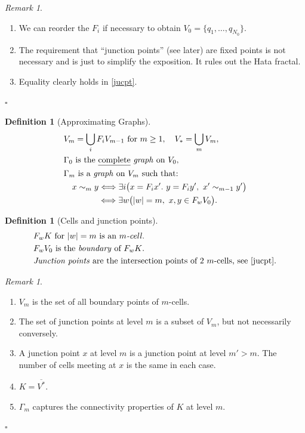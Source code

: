 \documentclass[a4paper]{amsart}
\theoremstyle{plain}
\theoremstyle{definition}
\newtheorem{definition}[theorem]{Definition}%
\theoremstyle{remark}
\newtheorem{remark}[theorem]{Remark}
\begin{document}
\begin{remark} \mbox{}
\begin{enumerate}
\item We can reorder the $ F_i $  if necessary to obtain $ V_0 =  \{ q_1,\dots , q_{N_0} \} $. 
\item The requirement that   ``junction points'' (see later) are fixed points is not necessary and is just to simplify the exposition.  It rules out the Hata fractal.
\item Equality clearly holds in \eqref{jucpt}.
\end{enumerate} 
\hfill $\square$  \end{remark} 

\begin{definition}[Approximating Graphs]  
\begin{align*} 
&V_m  = \bigcup _i F_i V_{m-1} \text{ for } m \geq 1, \quad  
 V_*  = \bigcup_m V_m, \\
& \Gamma_0  \text{ is the  \underline{complete} \emph{graph} on } V_0, \\
& \Gamma_m  \text{ is a \emph{graph} on $ V_m $ such that:}\\
&\quad  x\sim_m y   \Longleftrightarrow \exists i \big( x = F_i x'.\ y = F_i y',\ x' \sim_{m-1} y' \big) \\
&\quad  \qquad    \,  \quad                   \Longleftrightarrow \exists w \big( |w| = m,\ x,y \in F_w V_0 \big).
\end{align*}  
\end{definition} 

\begin{definition}[Cells and junction points]  
\begin{align*}
& F_w K \text{ for $ |w|=m $ is an \emph{$  m $-cell}}. \\
& F_w V_0 \text{ is the \emph{boundary} of $ F_w K $}.\\
&\text{\emph{Junction points} are the intersection points of 2 $ m $-cells,  see \eqref{jucpt}.}
\end{align*}
\end{definition}

\begin{remark}\mbox{}
\begin{enumerate}
\item $ V_m $ is the set of all boundary points of $ m $-cells.
\item The set of junction points at level $ m $ is a subset  of $ V_m $, but not necessarily conversely. 
\item A junction point $ x $ at level $ m $ is a junction point at level $ m'>m $. The number of cells meeting at $ x $ is the same in each case.
\item $ K = \overline{V^*} $.
\item $ \Gamma_m $ captures the connectivity properties of $ K $ at level $ m $.
\end{enumerate} 
\hfill $\square$  \end{remark} 
\end{document}
